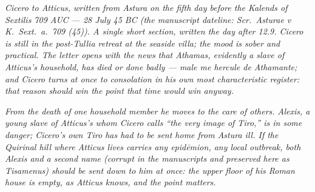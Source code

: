 
\textit{Cicero to Atticus, written from Astura on the
fifth day before the Kalends of Sextilis 709 AUC ---
28 July 45 BC (the manuscript dateline: \textit{Scr.\
Asturae v K.\ Sext.\ a.\ 709 (45)}). A single short
section, written the day after 12.9. Cicero is still
in the post-Tullia retreat at the seaside villa; the
mood is sober and practical. The letter opens with
the news that Athamas, evidently a slave of Atticus's
household, has died or done badly --- \textit{male me
hercule de Athamante}; and Cicero turns at once to
consolation in his own most characteristic register:
that reason should win the point that time would win
anyway.}

\textit{From the death of one household member he
moves to the care of others. Alexis, a young slave of
Atticus's whom Cicero calls ``the very image of
Tiro,'' is in some danger; Cicero's own Tiro has had
to be sent home from Astura ill. If the Quirinal hill
where Atticus lives carries any \textit{epid\=emion},
any local outbreak, both Alexis and a second name
(corrupt in the manuscripts and preserved here as
\dag Tisamenus\dag) should be sent down to him at
once: the upper floor of his Roman house is empty, as
Atticus knows, and the point matters.}
